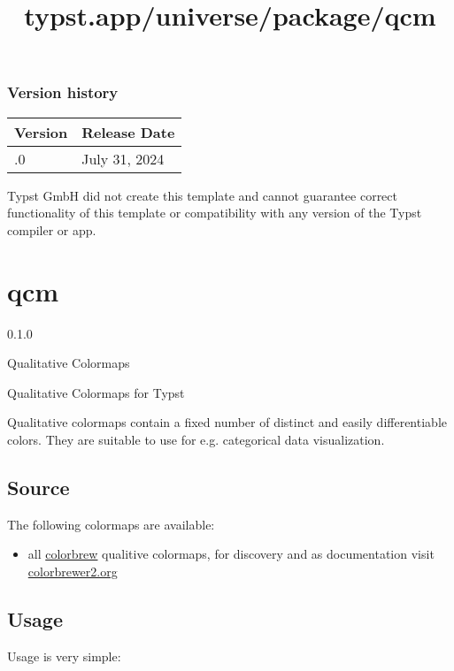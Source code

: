 \subsubsection{Version history}\label{version-history}

\begin{longtable}[]{@{}ll@{}}
\toprule\noalign{}
Version & Release Date \\
\midrule\noalign{}
\endhead
\bottomrule\noalign{}
\endlastfoot
0.1.0 & July 31, 2024 \\
\end{longtable}

Typst GmbH did not create this template and cannot guarantee correct
functionality of this template or compatibility with any version of the
Typst compiler or app.


\title{typst.app/universe/package/qcm}

\label{banner}
\section{qcm}\label{qcm}

{ 0.1.0 }

Qualitative Colormaps

\label{readme}
Qualitative Colormaps for Typst

Qualitative colormaps contain a fixed number of distinct and easily
differentiable colors. They are suitable to use for e.g. categorical
data visualization.

\subsection{Source}\label{source}

The following colormaps are available:

\begin{itemize}
\tightlist
\item
  all \href{https://github.com/axismaps/colorbrewer/}{colorbrew}
  qualitive colormaps, for discovery and as documentation visit
  \href{https://colorbrewer2.org/}{colorbrewer2.org}
\end{itemize}

\subsection{Usage}\label{usage}

Usage is very simple:

\begin{Shaded}
\begin{Highlighting}[]

\end{Highlighting}
\end{Shaded}

